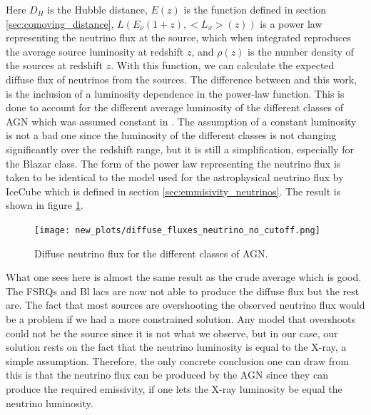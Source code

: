 Here $D_H$ is the Hubble distance, $E(z)$ is the function defined in section \ref{sec:comoving_distance}, $L(E_\nu (1+z), <L_x>(z))$ is a power law representing the neutrino flux at the source, which when integrated reproduces the average source luminosity at redshift $z$, and $\rho(z)$ is the number density of the sources at redshift $z$.
With this function, we can calculate the expected diffuse flux of neutrinos from the sources. The difference between \cite{Palladino_2020} and this work, is the inclusion of a luminosity dependence in the power-law function. This is done to account for the different average luminosity of the different classes of AGN which was assumed constant in \cite{Palladino_2020}. 
The assumption of a constant luminosity is not a bad one since the luminosity of the different classes is not changing significantly over the redshift range, but it is still a simplification, especially for the Blazar class. The form of the power law representing the neutrino flux is taken to be identical to the model used for the astrophysical neutrino flux by IceCube which is defined in section \ref*{sec:emmisivity_neutrinos}.
The result is shown in figure \ref{fig:neutrino_diffuse}.
\begin{figure}[H]
    \centering
    \texttt{[image: new\_plots/diffuse\_fluxes\_neutrino\_no\_cutoff.png]}
    \caption{Diffuse neutrino flux for the different classes of AGN.}
    \label{fig:neutrino_diffuse}
\end{figure}

What one sees here is almost the same result as the crude average which is good. The FSRQs and Bl lacs are now not able to produce the diffuse flux but the rest are. 
The fact that most sources are overshooting the observed neutrino flux would be a problem if we had a more constrained solution. Any model that overshoots could not be the source since it is not what we observe, but in our case, 
our solution rests on the fact that the neutrino luminosity is equal to the X-ray, a simple assumption. Therefore, the only concrete conclusion one can draw from this is that the neutrino flux can be produced by the AGN since they can produce the required emissivity, if one lets the X-ray luminosity be equal the neutrino luminosity.

